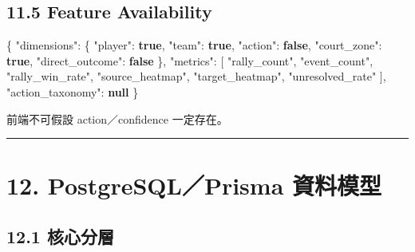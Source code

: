 \documentclass[
  9pt,
  a4paper,
]{article}
\newenvironment{Shaded}{}{}
\newcommand{\DataTypeTok}[1]{\textcolor[rgb]{0.56,0.13,0.00}{#1}}
\newcommand{\FunctionTok}[1]{\textcolor[rgb]{0.02,0.16,0.49}{#1}}
\newcommand{\KeywordTok}[1]{\textcolor[rgb]{0.00,0.44,0.13}{\textbf{#1}}}
\newcommand{\OtherTok}[1]{\textcolor[rgb]{0.00,0.44,0.13}{#1}}
\newcommand{\StringTok}[1]{\textcolor[rgb]{0.25,0.44,0.63}{#1}}
\begin{document}
\subsection{11.5 Feature Availability}\label{115-feature-availability}

\begin{Shaded}
\begin{Highlighting}[]
\FunctionTok{\{}
  \DataTypeTok{"dimensions"}\FunctionTok{:} \FunctionTok{\{}
    \DataTypeTok{"player"}\FunctionTok{:} \KeywordTok{true}\FunctionTok{,}
    \DataTypeTok{"team"}\FunctionTok{:} \KeywordTok{true}\FunctionTok{,}
    \DataTypeTok{"action"}\FunctionTok{:} \KeywordTok{false}\FunctionTok{,}
    \DataTypeTok{"court\_\allowbreak{}zone"}\FunctionTok{:} \KeywordTok{true}\FunctionTok{,}
    \DataTypeTok{"direct\_\allowbreak{}outcome"}\FunctionTok{:} \KeywordTok{false}
  \FunctionTok{\},}
  \DataTypeTok{"metrics"}\FunctionTok{:} \OtherTok{[}
    \StringTok{"rally\_\allowbreak{}count"}\OtherTok{,}
    \StringTok{"event\_\allowbreak{}count"}\OtherTok{,}
    \StringTok{"rally\_\allowbreak{}win\_\allowbreak{}rate"}\OtherTok{,}
    \StringTok{"source\_\allowbreak{}heatmap"}\OtherTok{,}
    \StringTok{"target\_\allowbreak{}heatmap"}\OtherTok{,}
    \StringTok{"unresolved\_\allowbreak{}rate"}
  \OtherTok{]}\FunctionTok{,}
  \DataTypeTok{"action\_\allowbreak{}taxonomy"}\FunctionTok{:} \KeywordTok{null}
\FunctionTok{\}}
\end{Highlighting}
\end{Shaded}

前端不可假設 action／confidence 一定存在。

\begin{center}\rule{0.5\linewidth}{0.5pt}\end{center}

\section{12. PostgreSQL／Prisma
資料模型}\label{12-postgresqlprisma-ux8cc7ux6599ux6a21ux578b}

\subsection{12.1 核心分層}\label{121-ux6838ux5fc3ux5206ux5c64}
\end{document}
